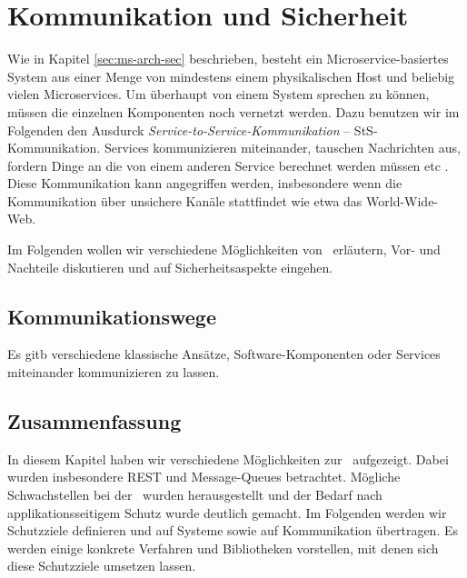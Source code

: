 \section{Kommunikation und Sicherheit}

Wie in Kapitel \ref{sec:ms-arch-sec} beschrieben, besteht ein Microservice-basiertes System aus einer Menge von mindestens einem physikalischen Host und beliebig vielen Microservices. Um überhaupt von einem System sprechen zu können, müssen die einzelnen Komponenten noch vernetzt werden. Dazu benutzen wir im Folgenden den Ausdurck \textit{Service-to-Service-Kommunikation} -- StS-Kommunikation. Services kommunizieren miteinander, tauschen Nachrichten aus, fordern Dinge an die von einem anderen Service berechnet werden müssen etc \cite{newman2015}. Diese Kommunikation kann angegriffen werden, insbesondere wenn die Kommunikation über unsichere Kanäle stattfindet wie etwa das World-Wide-Web.

Im Folgenden wollen wir verschiedene Möglichkeiten von \stscom\ erläutern, Vor- und Nachteile diskutieren und auf Sicherheitsaspekte eingehen.

\subsection{Kommunikationswege}

Es gitb verschiedene klassische Ansätze, Software-Komponenten oder Services miteinander kommunizieren zu lassen.


\subsection{Zusammenfassung}

In diesem Kapitel haben wir verschiedene Möglichkeiten zur \stscom\ aufgezeigt. Dabei wurden insbesondere REST und Message-Queues betrachtet. Mögliche Schwachstellen bei der \stscom\ wurden herausgestellt und der Bedarf nach applikationsseitigem Schutz wurde deutlich gemacht. Im Folgenden werden wir Schutzziele definieren und auf Systeme sowie auf Kommunikation übertragen. Es werden einige konkrete Verfahren und Bibliotheken vorstellen, mit denen sich diese Schutzziele umsetzen lassen. 